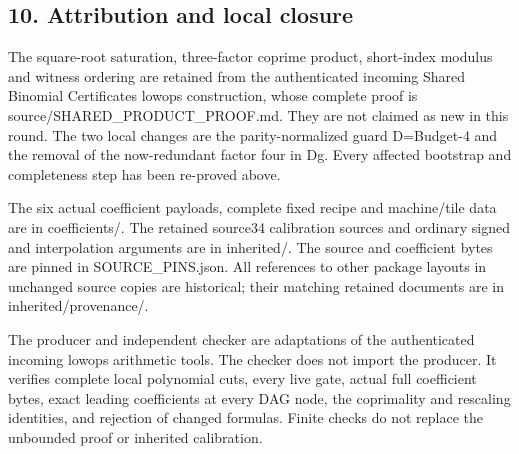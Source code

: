 \subsection{10. Attribution and local closure}



The square-root saturation, three-factor coprime product, short-index modulus and witness ordering are retained from the authenticated incoming Shared Binomial Certificates lowops construction, whose complete proof is source/\allowbreak{}SHARED\_\allowbreak{}PRODUCT\_\allowbreak{}PROOF.md. They are not claimed as new in this round. The two local changes are the parity-normalized guard D=\allowbreak{}Budget-4 and the removal of the now-redundant factor four in Dg. Every affected bootstrap and completeness step has been re-proved above.



The six actual coefficient payloads, complete fixed recipe and machine/\allowbreak{}tile data are in coefficients/. The retained source34 calibration sources and ordinary signed and interpolation arguments are in inherited/. The source and coefficient bytes are pinned in SOURCE\_\allowbreak{}PINS.json. All references to other package layouts in unchanged source copies are historical; their matching retained documents are in inherited/\allowbreak{}provenance/.



The producer and independent checker are adaptations of the authenticated incoming lowops arithmetic tools. The checker does not import the producer. It verifies complete local polynomial cuts, every live gate, actual full coefficient bytes, exact leading coefficients at every DAG node, the coprimality and rescaling identities, and rejection of changed formulas. Finite checks do not replace the unbounded proof or inherited calibration.
